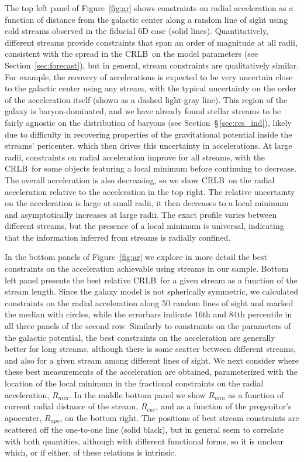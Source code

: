 \documentclass[modern]{aastex61}
\newcommand{\acronym}[1]{{\small{#1}}}
\newcommand{\CRLB}{\acronym{CRLB}}
\begin{document}
The top left panel of Figure~\ref{fig:ar} shows constraints on radial acceleration as a function of distance from the galactic center along a random line of sight using cold streams observed in the fiducial 6D case (solid lines).
Quantitatively, different streams provide constraints that span an order of magnitude at all radii, consistent with the spread in the \CRLB\ on the model parameters (see Section~\ref{sec:forecast}), but in general, stream constraints are qualitatively similar.
For example, the recovery of accelerations is expected to be very uncertain close to the galactic center using any stream, with the typical uncertainty on the order of the acceleration itself (shown as a dashed light-gray line).
This region of the galaxy is baryon-dominated, and we have already found stellar streams to be fairly agnostic on the distribution of baryons (see Section~\S\,\ref{sec:res_ind}), likely due to difficulty in recovering properties of the gravitational potential inside the streams' pericenter, which then drives this uncertainty in accelerations.
At large radii, constraints on radial acceleration improve for all streams, with the \CRLB\ for some objects featuring a local minimum before continuing to decrease.
The overall acceleration is also decreasing, so we show \CRLB\ on the radial acceleration relative to the acceleration in the top right.
The relative uncertainty on the acceleration is large at small radii, it then decreases to a local minimum and asymptotically increases at large radii.
The exact profile varies between different streams, but the presence of a local minimum is universal, indicating that the information inferred from streams is radially confined.

In the bottom panels of Figure~\ref{fig:ar} we explore in more detail the best constraints on the acceleration achievable using streams in our sample.
Bottom left panel presents the best relative \CRLB\ for a given stream as a function of the stream length.
Since the galaxy model is not spherically symmetric, we calculated constraints on the radial acceleration along 50 random lines of sight and marked the median with circles, while the errorbars indicate 16th and 84th percentile in all three panels of the second row.
Similarly to constraints on the parameters of the galactic potential, the best constraints on the acceleration are generally better for long streams, although there is some scatter between different streams, and also for a given stream among different lines of sight.
We next consider where these best measurements of the acceleration are obtained, parameterized with the location of the local minimum in the fractional constraints on the radial acceleration, $R_{min}$.
In the middle bottom panel we show $R_{min}$ as a function of current radial distance of the stream, $R_{cur}$, and as a function of the progenitor's apocenter, $R_{apo}$, on the bottom right.
The positions of best stream constraints are scattered off the one-to-one line (solid black), but in general seem to correlate with both quantities, although with different functional forms, so it is unclear which, or if either, of these relations is intrinsic.
\end{document}
